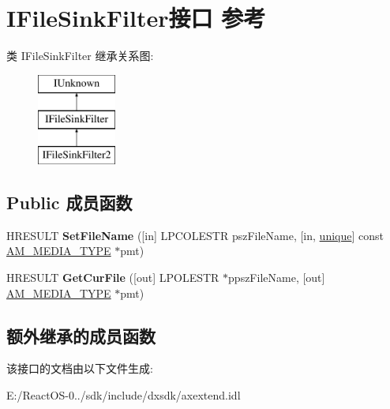 \hypertarget{interface_i_file_sink_filter}{}\section{I\+File\+Sink\+Filter接口 参考}
\label{interface_i_file_sink_filter}
类 I\+File\+Sink\+Filter 继承关系图\+:\begin{figure}[H]
\begin{center}
\leavevmode
\includegraphics[height=3.000000cm]{interface_i_file_sink_filter}
\end{center}
\end{figure}
\subsection*{Public 成员函数}
\begin{DoxyCompactItemize}
\item 
\mbox{\label{interface_i_file_sink_filter_a1857083fbef75a772fca671a8cc6a5d5}} 
H\+R\+E\+S\+U\+LT {\bfseries Set\+File\+Name} (\mbox{[}in\mbox{]} L\+P\+C\+O\+L\+E\+S\+TR psz\+File\+Name, \mbox{[}in, \hyperlink{interfaceunique}{unique}\mbox{]} const \hyperlink{struct_a_m___m_e_d_i_a___t_y_p_e}{A\+M\+\_\+\+M\+E\+D\+I\+A\+\_\+\+T\+Y\+PE} $\ast$pmt)
\item 
\mbox{\label{interface_i_file_sink_filter_aefb9b0ef7a8f7e69667a94ea1262f017}} 
H\+R\+E\+S\+U\+LT {\bfseries Get\+Cur\+File} (\mbox{[}out\mbox{]} L\+P\+O\+L\+E\+S\+TR $\ast$ppsz\+File\+Name, \mbox{[}out\mbox{]} \hyperlink{struct_a_m___m_e_d_i_a___t_y_p_e}{A\+M\+\_\+\+M\+E\+D\+I\+A\+\_\+\+T\+Y\+PE} $\ast$pmt)
\end{DoxyCompactItemize}
\subsection*{额外继承的成员函数}


该接口的文档由以下文件生成\+:\begin{DoxyCompactItemize}
\item 
E\+:/\+React\+O\+S-\/0../sdk/include/dxsdk/axextend.\+idl\end{DoxyCompactItemize}
